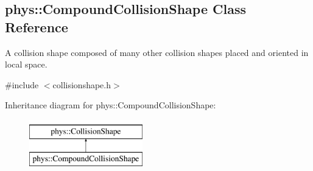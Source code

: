 \hypertarget{classphys_1_1CompoundCollisionShape}{
\subsection{phys::CompoundCollisionShape Class Reference}
\label{classphys_1_1CompoundCollisionShape}
}


A collision shape composed of many other collision shapes placed and oriented in local space.  




{\ttfamily \#include $<$collisionshape.h$>$}

Inheritance diagram for phys::CompoundCollisionShape:\begin{figure}[H]
\begin{center}
\leavevmode
\includegraphics[height=2.000000cm]{classphys_1_1CompoundCollisionShape}
\end{center}
\end{figure}
